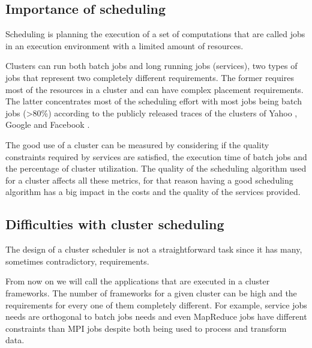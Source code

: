 \documentclass{article}                     %
\begin{document}
\subsection{Importance of scheduling}

Scheduling is planning the execution of a set of computations that
are called jobs in an execution environment with a limited amount of
resources.



Clusters can run both batch jobs and long running jobs (services), two
types of jobs that represent two completely different requirements.
The former requires most of the resources in a cluster and can have
complex placement requirements. The latter concentrates most of the scheduling
effort with most jobs being batch jobs (\textgreater 80\%) according to the publicly
released traces of the clusters of Yahoo \cite{parashar_10th_2010}, Google \cite{mishra_towards_2010} and Facebook \cite{Chen:EECS-2012-17}.

The good use of a cluster can be measured by considering if the
quality constraints required by services are satisfied, the execution
time of batch jobs and the percentage of cluster utilization. The
quality of the scheduling algorithm used for a cluster affects all
these metrics, for that reason having a good scheduling algorithm has a big
impact in the costs and the quality of the services provided.

\subsection{Difficulties with cluster scheduling}

The design of a cluster scheduler is not a straightforward
task since it has many, sometimes contradictory, requirements.

From now on we will call the applications that are executed in a
cluster frameworks.  The number of frameworks for a given cluster can
be high and the requirements for every one of them completely
different. For example, service jobs needs are orthogonal to batch
jobs needs and even MapReduce \cite{dean_mapreduce:_2008} jobs have
different constraints than MPI \cite{gabriel04:_open_mpi} jobs despite
both being used to process and transform data.
\end{document}
